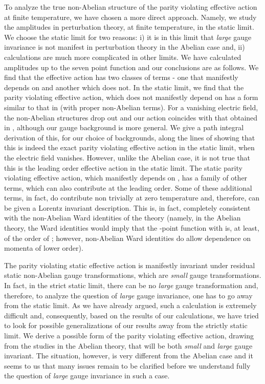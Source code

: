 \documentclass[a4paper,12pt]{article}
\begin{document}
To analyze the true non-Abelian structure of the parity violating
effective action at finite temperature, we have chosen a more direct
approach. Namely, we study the amplitudes in perturbation theory, at
finite temperature, in the static limit. We choose the static limit
for two reasons: i) it is in this limit that {\it large} gauge
invariance is not manifest in perturbation theory in the Abelian case
and, ii) calculations are much more complicated in other limits. We
have calculated amplitudes up to the seven point function and our
conclusions are as follows. We find that the effective action has two
classes of terms - one that manifestly depends on \coordHE{} and another
which does not. In the static limit, we find that the parity violating
effective action, which does not manifestly depend on \coordHE{}  has a
form  similar to that in \cite{fosco:1997vu}
(with proper non-Abelian terms). For a vanishing electric field, the
non-Abelian structures drop out and our action coincides with that
obtained in \cite{fosco:1997vu}, although our gauge background is more general.
We give a path integral derivation of this, for our choice of
backgrounds,  along the lines of
\cite{fosco:1997vu} showing that this is indeed the
exact parity 
violating effective action in the static limit, when the electric
field  vanishes. However, unlike the Abelian case, it is not true that 
this is the leading order effective action in the static limit. 
The static parity violating effective action, which manifestly depends
on \coordHE{}, has a family of other terms, which can also 
contribute at the leading order. Some of these additional terms, in
fact, do contribute non trivially at zero
temperature and, therefore, can be given a Lorentz invariant
description. 
This is, in fact, completely consistent with
the non-Abelian Ward identities of the theory (namely, in the Abelian
theory, the Ward identities would imply that the \coordHE{}-point function
with \coordHE{} is, at least, of the order of \coordHE{}
\cite{coleman:1985zi}; however,   non-Abelian
Ward identities do allow dependence on momenta of lower order).

The parity violating static effective action is manifestly invariant
under residual static non-Abelian gauge transformations, which are
{\it small} gauge transformations. In fact, in the strict static
limit, there can be no {\it large} gauge transformation and,
therefore, to analyze the question of {\it large} gauge invariance,
one has to go away from the static limit. As we have already
argued, such a calculation is extremely difficult and,
consequently, based on the results of our calculations, we have tried
to look for possible generalizations of our results away from the
strictly static limit. We derive a possible form of the parity
violating effective action, drawing from the studies in the Abelian
theory,  that will be both {\it small} and {\it large} gauge
invariant. The situation, however, is very different from the Abelian
case and it seems to us that many issues remain to be clarified before
we understand fully the question of {\it  large}  gauge invariance in
such a case. 
\end{document}
